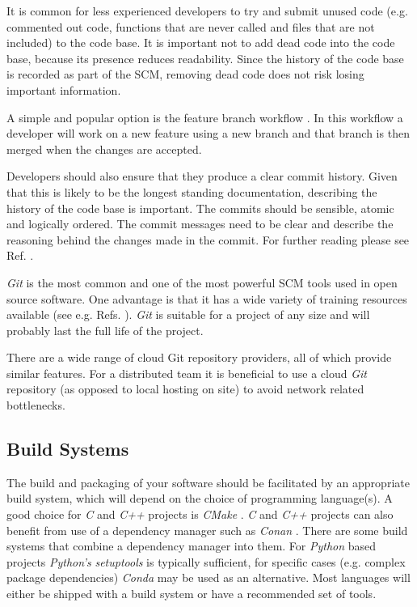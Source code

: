\documentclass[jnr]{iosart2x}
\begin{document}
It is common for less experienced developers to try and submit unused code (e.g. commented out code, functions that are never called and files that are not included) to the code base.
It is important not to add dead code into the code base, because its presence reduces readability.
Since the history of the code base is recorded as part of the SCM, removing dead code does not risk losing important information.

A simple and popular option is the feature branch workflow \cite{feature-branch}.
In this workflow a developer will work on a new feature using a new branch and that branch is then merged when the changes are accepted.

Developers should also ensure that they produce a clear commit history.
Given that this is likely to be the longest standing documentation, describing the history of the code base is important.
The commits should be sensible, atomic and logically ordered.
The commit messages need to be clear and describe the reasoning behind the changes made in the commit.
For further reading please see Ref. \cite{git-commit}.

{\it Git} \cite{Git} is the most common and one of the most powerful SCM tools used in open source software.
One advantage is that it has a wide variety of training resources available (see e.g. Refs. \cite{github-git, atlassian-git, codecademy-git}).
{\it Git} is suitable for a project of any size and will probably last the full life of the project.

There are a wide range of cloud Git repository providers, all of which provide similar features.
For a distributed team it is beneficial to use a cloud {\it Git} repository (as opposed to local hosting on site) to avoid network related bottlenecks.

\subsection{Build Systems}
\label{Build systems}

The build and packaging of your software should be facilitated by an appropriate build system, which will depend on the choice of programming language(s).
A good choice for {\it C} and {\it C++} projects is {\it CMake} \cite{CMake}.
{\it C} and {\it C++} projects can also benefit from use of a dependency manager such as {\it Conan} \cite{Conan}.
There are some build systems that combine a dependency manager into them.
For {\it Python} based projects {\it Python's} {\it setuptools} is typically sufficient, for specific cases (e.g. complex package dependencies) {\it Conda} may be used as an alternative.
Most languages will either be shipped with a build system or have a recommended set of tools.
\end{document}

